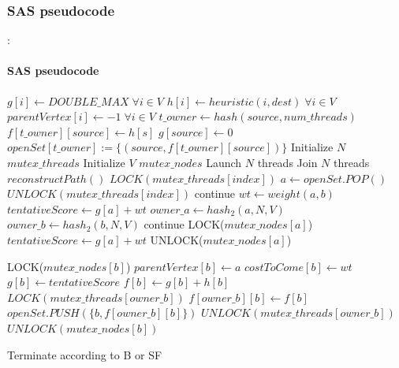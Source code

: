 \documentclass[12pt]{beamer}
\begin{document}
	\subsubsection{SAS pseudocode}
	\begin{frame}[allowframebreaks]{\secname : \subsecname}
		\framesubtitle{SAS pseudocode}
		\begin{algorithmic}[1]
				\State $g[i] \gets DOUBLE\_MAX \;\forall i \in V$\;
				\State $h[i] \gets heuristic(i, dest) \; \forall i \in V$\;
				\State $parentVertex[i] \gets -1 \; \forall i \in V$\;
				\State $t\_owner \gets hash(source, num\_threads)$\;
				\State $f[t\_owner][source] \gets h[s]$\;
				\State $g[source] \gets 0$\;
				\State $openSet[t\_owner] := \{(source, f[t\_owner][source])\}$\;
				\State Initialize $N$ $mutex\_threads$\;
				\State Initialize $V$ $mutex\_nodes$\;
				\State Launch $N$ threads\;
				\State Join $N$ threads\;
				\State $reconstructPath()$\;
			\EndFunction
        				\State $LOCK(mutex\_threads[index])$\;
        				\State $a \gets openSet.POP()$\;
        				\State $UNLOCK(mutex\_threads[index])$\;
      				\EndWhile
        			\State continue\;
      			\EndIf
        			\State $wt \gets weight(a, b)$\;
        			\State $tentativeScore \gets g[a] + wt$\;
          				\State $owner\_a \gets hash_2(a,N,V)$\;
          				\State $owner\_b \gets hash_2(b,N,V)$\;
					\EndIf
            			\State continue\;
          			\EndIf
          			\State LOCK($mutex\_nodes[a]$)\;
          			\State $tentativeScore \gets g[a] + wt$\;
          			\State UNLOCK($mutex\_nodes[a]$)\;

          			\State LOCK($mutex\_nodes[b]$)\;
					    \State $parentVertex[b] \gets a$\;
            			\State $costToCome[b] \gets wt$\;
            			\State $g[b] \gets tentativeScore$\;
            			\State $f[b] \gets g[b] + h[b]$\;
            			\State $LOCK(mutex\_threads[owner\_b])$\;
            			\State $f[owner\_b][b] \gets f[b]$\;
            			\State $openSet.PUSH(\{b, f[owner\_b][b]\})$\;
            			\State $UNLOCK(mutex\_threads[owner\_b])$\;
          			\EndIf
          			\State $UNLOCK(mutex\_nodes[b])$\;
        		\EndFor
				\EndWhile

        		\State Terminate according to B or SF\;
      		\EndIf
		  \EndFunction
		  \end{algorithmic}
	\end{frame}
\end{document}
